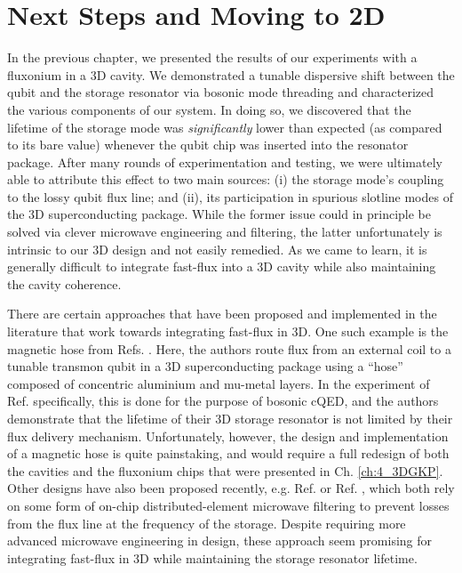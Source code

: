 \chapter{Next Steps and Moving to 2D\label{ch:5_2DGKP}}


In the previous chapter, we presented the results of our experiments with a fluxonium in a 3D cavity. We demonstrated a tunable dispersive shift between the qubit and the storage resonator via bosonic mode threading and characterized the various components of our system. In doing so, we discovered that the lifetime of the storage mode was \textit{significantly} lower than expected (as compared to its bare value) whenever the qubit chip was inserted into the resonator package. After many rounds of experimentation and testing, we were ultimately able to attribute this effect to two main sources: (i) the storage mode's coupling to the lossy qubit flux line; and (ii), its participation in spurious slotline modes of the 3D superconducting package. While the former issue could in principle be solved via clever microwave engineering and filtering, the latter unfortunately is intrinsic to our 3D design and not easily remedied. As we came to learn, it is generally difficult to integrate fast-flux into a 3D cavity while also maintaining the cavity coherence. 

There are certain approaches that have been proposed and implemented in the literature that work towards integrating fast-flux in 3D. One such example is the magnetic hose from Refs. \cite{gargiulo2021fast,valadares2023demand}. Here, the authors route flux from an external coil to a tunable transmon qubit in a 3D superconducting package using a ``hose'' composed of concentric aluminium and mu-metal layers. In the experiment of Ref. \cite{valadares2023demand} specifically, this is done for the purpose of bosonic cQED, and the authors demonstrate that the lifetime of their 3D storage resonator is not limited by their flux delivery mechanism. Unfortunately, however, the design and implementation of a magnetic hose is quite painstaking, and would require a full redesign of both the cavities and the fluxonium chips that were presented in Ch. \ref{ch:4_3DGKP}. Other designs have also been proposed recently, e.g. Ref. \cite{hutin2024monitoring} or Ref. \cite{maiti2024ancilla}, which both rely on some form of on-chip distributed-element microwave filtering to prevent losses from the flux line at the frequency of the storage. Despite requiring more advanced microwave engineering in design, these approach seem promising for integrating fast-flux in 3D while maintaining the storage resonator lifetime. 


